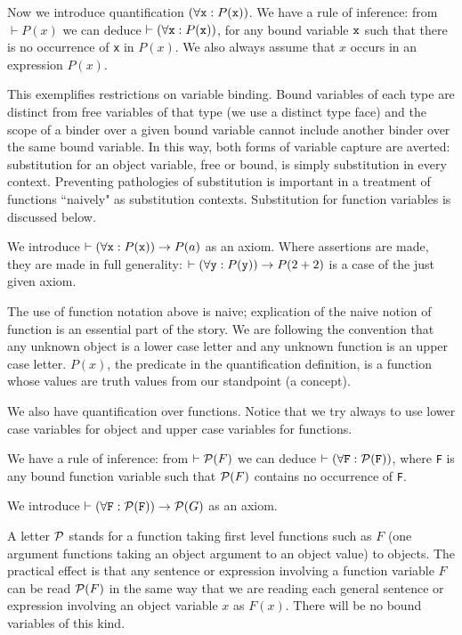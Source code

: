 \documentclass[12pt]{article}
\begin{document}
Now we introduce quantification $(\forall {\tt x}:P({\tt x}))$.  We have a rule of inference:  from $\vdash P(x)$ we can deduce $\vdash (\forall {\tt x}:P({\tt x}))$, for any bound variable ${\tt x}$ such that there is no occurrence
of {\tt x} in $P(x)$.  We also always assume that $x$ occurs in an expression $P(x)$.

This exemplifies restrictions on variable binding.  Bound variables of each type are distinct from free variables of that type (we use a distinct type face) and the scope of a binder over a given bound variable cannot include another binder over the same bound variable.  In this way, both forms of variable capture are averted:  substitution for an object variable, free or bound, is simply substitution in every context.  Preventing pathologies of substitution is important in a treatment of functions ``naively" as substitution contexts.  Substitution for function variables is discussed below.

We introduce $\vdash (\forall {\tt x}:P({\tt x})) \rightarrow P(a)$ as an axiom.  Where assertions are made, they are made in full generality:  $\vdash (\forall {\tt y}:P({\tt y})) \rightarrow P(2+2)$ is a case of the just given axiom.

The use of function notation above is naive;  explication of the naive notion of function is an essential part of the story.  We are following the convention that any unknown
object is a lower case letter and any unknown function is an upper case letter.  $P(x)$, the predicate in the quantification definition, is a function whose values are truth values from our standpoint (a concept).

We also have quantification over functions.  Notice that we try always to use lower case variables for object and upper case variables for functions.

We have a rule of inference:  from $\vdash {\cal P}(F)$ we can deduce $\vdash (\forall {\tt F}:{\cal P}({\tt F}))$, where {\tt F} is any bound function variable such that ${\cal P}(F)$ contains no occurrence of {\tt F}.

We introduce $\vdash (\forall {\tt F}:{\cal P}({\tt F})) \rightarrow {\cal P}(G)$ as an axiom.

A letter ${\cal P}$ stands for a function taking first level functions such as $F$ (one argument functions taking an object argument to an object value) to objects.  The practical effect is that any sentence or expression involving  a function variable $F$ can be read ${\cal P}(F)$ in the same way that we are reading each general sentence or expression involving an object variable $x$ as $F(x)$.  There will be no bound variables of this kind.
\end{document}
